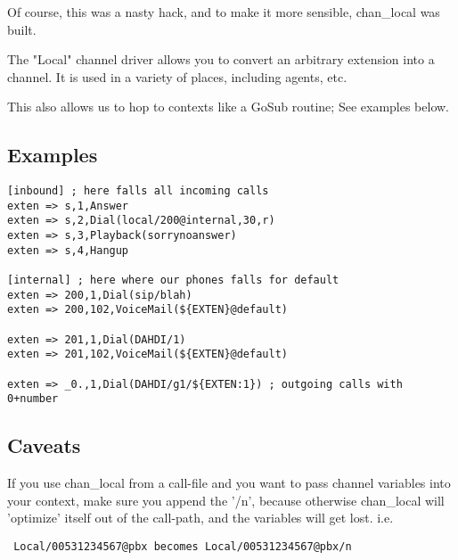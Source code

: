 Of course, this was a nasty hack, and to make it more sensible, chan\_local was
built.

The "Local" channel driver allows you to convert an arbitrary extension into a
channel. It is used in a variety of places, including agents, etc.

This also allows us to hop to contexts like a GoSub routine; See examples below.

\subsection{Examples}
\begin{astlisting}
\begin{verbatim}
[inbound] ; here falls all incoming calls
exten => s,1,Answer
exten => s,2,Dial(local/200@internal,30,r)
exten => s,3,Playback(sorrynoanswer)
exten => s,4,Hangup

[internal] ; here where our phones falls for default
exten => 200,1,Dial(sip/blah)
exten => 200,102,VoiceMail(${EXTEN}@default)

exten => 201,1,Dial(DAHDI/1)
exten => 201,102,VoiceMail(${EXTEN}@default)

exten => _0.,1,Dial(DAHDI/g1/${EXTEN:1}) ; outgoing calls with 0+number
\end{verbatim}
\end{astlisting}

\subsection{Caveats}

If you use chan\_local from a call-file and you want to pass channel variables
into your context, make sure you append the '/n', because otherwise
chan\_local will 'optimize' itself out of the call-path, and the variables will
get lost. i.e.

\begin{verbatim}
 Local/00531234567@pbx becomes Local/00531234567@pbx/n
\end{verbatim}

